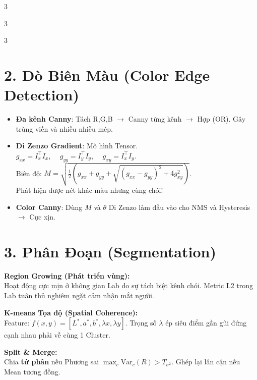 \documentclass[9pt,landscape,a4paper]{extarticle}
\begin{document}
\begin{multicols*}{3}
\begin{multicols*}{3}
\begin{multicols}{3}
\section{2. Dò Biên Màu (Color Edge Detection)}
\begin{itemize}
    \item \textbf{Đa kênh Canny}: Tách R,G,B $\to$ Canny từng kênh $\to$ Hợp (OR). Gây trùng viền và nhiều nhiễu mép.
    \item \textbf{Di Zenzo Gradient}: Mô hình Tensor.\\
    $g_{xx} = I_x^\top I_x$, $\quad g_{yy} = I_y^\top I_y$, $\quad g_{xy} = I_x^\top I_y$.\\
    Biên độ: $M = \sqrt{\frac{1}{2}\left(g_{xx} + g_{yy} + \sqrt{(g_{xx}-g_{yy})^2 + 4g_{xy}^2}\right)}$.\\
    Phát hiện được nét khác màu nhưng cùng chói!
    \item \textbf{Color Canny}: Dùng $M$ và $\theta$ Di Zenzo làm đầu vào cho NMS và Hysteresis $\to$ Cực xịn.
\end{itemize}

\section{3. Phân Đoạn (Segmentation)}
\begin{infobox}
\textbf{Region Growing (Phát triển vùng):}\\
Hoạt động cực mịn ở không gian Lab do sự tách biệt kênh chói. Metric L2 trong Lab tuân thủ nghiêm ngặt cảm nhận mắt người.
\end{infobox}
\begin{infobox}
\textbf{K-means Tọa độ (Spatial Coherence):}\\
Feature: $f(x,y) = [L^*, a^*, b^*, \lambda x, \lambda y]$. Trọng số $\lambda$ ép siêu điểm gần gũi đứng cạnh nhau phải về cùng 1 Cluster.
\end{infobox}
\begin{infobox}
\textbf{Split \& Merge:}\\
Chia \textbf{tứ phân} nếu Phương sai $\max_c \text{Var}_c(R) > T_{\sigma^2}$. Ghép lại lân cận nếu Mean tương đồng.
\end{infobox}

\end{multicols}

\end{multicols*}

\end{multicols*}
\end{document}
